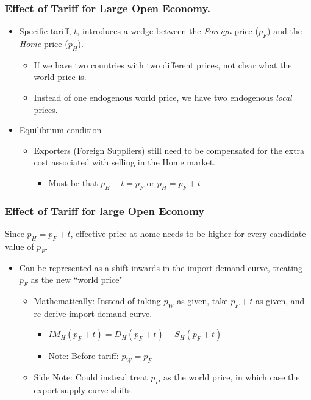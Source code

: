 \documentclass{beamer}
\begin{document}
\begin{frame}
	\frametitle{Effect of Tariff for Large Open Economy.}
	\begin{itemize}
		\item Specific tariff, $t$, introduces a wedge between the \emph{Foreign} price ($p_F$) and the \emph{Home} price ($p_H$).
		\begin{itemize}
			\item If we have two countries with two different prices, not clear what the world price is.
			\item Instead of one endogenous world price, we have two endogenous \emph{local} prices.
		\end{itemize}
	\item Equilibrium condition
		\begin{itemize}
		\item Exporters (Foreign Suppliers) still need to be compensated for the extra cost associated with selling in the Home market.
		\begin{itemize}
			\item Must be that $p_H-t=p_F$ or $p_H = p_F + t$
		\end{itemize}
	\end{itemize}
	\end{itemize}
\end{frame}

\begin{frame}
	\frametitle{Effect of Tariff for large Open Economy}
Since $p_H=p_F+t$, effective price at home needs to be higher for every candidate value of $p_F$.
	\begin{itemize}
		\item Can be represented as a shift inwards in the import demand curve, treating $p_F$ as the new ``world price"
		\begin{itemize}
			\item Mathematically: Instead of taking $p_W$ as given, take $p_F+t$ as given, and re-derive import demand curve.
			\begin{itemize}
				\item $IM_H(p_F+t)=D_H(p_F+t) - S_H(p_F+t) $
				\item Note: Before tariff: $p_W=p_F$
			\end{itemize}
			\item Side Note: Could instead treat $p_H$ as the world price, in which case the export supply curve shifts.
		\end{itemize}
	\end{itemize}
\end{frame}
\end{document}
